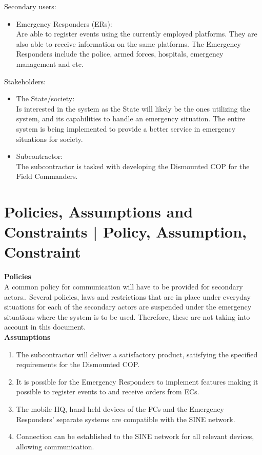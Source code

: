 \noindent Secondary users:
\begin{itemize}
	\item Emergency Responders (ERs):\\
	Are able to register events using the currently employed platforms. They are also able to receive information on the same platforms. The Emergency Responders include the police, armed forces, hospitals, emergency management and etc.
\end{itemize}

\noindent Stakeholders:
\begin{itemize}
	\item The State/society: \\
	Is interested in the system as the State will likely be the ones utilizing the system, and its capabilities to handle an emergency situation. The entire system is being implemented to provide a better service in emergency situations for society.
	\item Subcontractor:\\
	The subcontractor is tasked with developing the Dismounted COP for the Field Commanders.
\end{itemize}


\section{Policies, Assumptions and Constraints | Policy, Assumption, Constraint}
\textbf{Policies} \\
A common policy for communication will have to be provided for secondary actors.. 
Several policies, laws and restrictions that are in place under everyday situations for each of the secondary actors are suspended under the emergency situations where the system is to be used. Therefore, these are not taking into account in this document.\\

\noindent \textbf{Assumptions}
\begin{enumerate}
	\itemsep0em
	\item The subcontractor will deliver a satisfactory product, satisfying the specified requirements for the Dismounted COP.
	\item It is possible for the Emergency Responders to implement features making it possible to register events to and receive orders from ECs.
	\item The mobile HQ, hand-held devices of the FCs and the Emergency Responders’ separate systems are compatible with the SINE network.
	\item Connection can be established to the SINE network for all relevant devices, allowing communication.
\end{enumerate}

